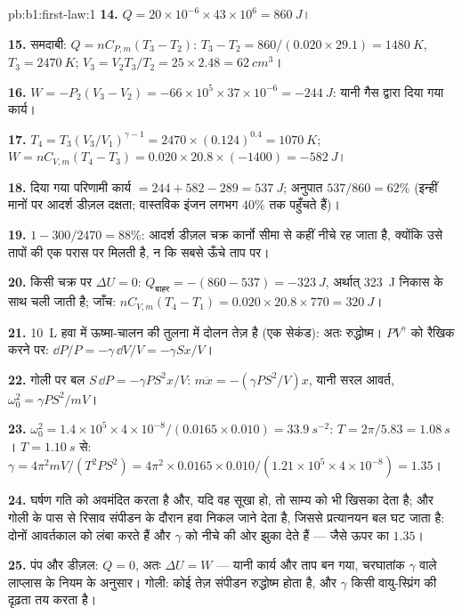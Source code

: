 \begin{solution}{pb:b1:first-law:1}
\textbf{14.} $Q = 20\times10^{-6} \times 43\times10^6 = \qty{860}{J}$।

\textbf{15.} समदाबी: $Q = nC_{P,m}(T_3 - T_2)$: $T_3 - T_2 = 860/(0.020 \times
29.1) = \qty{1480}{K}$, $T_3 = \qty{2470}{K}$; $V_3 = V_2T_3/T_2 = 25 \times
2.48 = \qty{62}{cm^3}$।

\textbf{16.} $W = -P_2(V_3 - V_2) = -66\times10^5 \times 37\times10^{-6} =
\qty{-244}{J}$: यानी गैस द्वारा दिया गया कार्य।

\textbf{17.} $T_4 = T_3(V_3/V_1)^{\gamma - 1} = 2470 \times (0.124)^{0.4} =
\qty{1070}{K}$; $W = nC_{V,m}(T_4 - T_3) = 0.020 \times 20.8 \times (-1400) =
\qty{-582}{J}$।

\textbf{18.} दिया गया परिणामी कार्य $= 244 + 582 - 289 = \qty{537}{J}$; अनुपात
$537/860 = 62\%$ (इन्हीं मानों पर आदर्श डीज़ल दक्षता; वास्तविक इंजन लगभग
$40\%$ तक पहुँचते हैं)।

\textbf{19.} $1 - 300/2470 = 88\%$: आदर्श डीज़ल चक्र कार्नो सीमा से कहीं
नीचे रह जाता है, क्योंकि उसे  तापों की एक परास पर मिलती है, न कि
सबसे ऊँचे ताप पर।

\textbf{20.} किसी चक्र पर $\Delta U = 0$: $Q_{\text{बाहर}} = -(860 - 537) =
\qty{-323}{J}$, अर्थात् \qty{323}{J} निकास के साथ चली जाती है; जाँच:
$nC_{V,m}(T_4 - T_1) = 0.020 \times 20.8 \times 770 = \qty{320}{J}$।

\textbf{21.} \qty{10}{L} हवा में ऊष्मा-चालन की तुलना में दोलन तेज़ है (एक
सेकंड): अतः रुद्धोष्म। $PV^\gamma$ को रैखिक करने पर:
$\dd P/P = -\gamma\,\dd V/V = -\gamma Sx/V$।

\textbf{22.} गोली पर बल $S\,\dd P = -\gamma PS^2x/V$: $m\ddot x =
-(\gamma PS^2/V)x$, यानी सरल आवर्त, $\omega_0^2 = \gamma PS^2/mV$।

\textbf{23.} $\omega_0^2 = 1.4 \times 10^5 \times 4\times10^{-8}/(0.0165 \times 0.010)
= \qty{33.9}{s^{-2}}$: $T = 2\pi/5.83 = \qty{1.08}{s}$। $T = \qty{1.10}{s}$ से:
$\gamma = 4\pi^2mV/(T^2PS^2) = 4\pi^2 \times 0.0165 \times 0.010/(1.21 \times 10^5
\times 4\times10^{-8}) = 1.35$।

\textbf{24.} घर्षण गति को अवमंदित करता है और, यदि वह सूखा हो, तो साम्य को
भी खिसका देता है; और गोली के पास से रिसाव संपीडन के दौरान हवा निकल जाने
देता है, जिससे प्रत्यानयन बल घट जाता है: दोनों आवर्तकाल को लंबा करते हैं
और $\gamma$ को नीचे की ओर झुका देते हैं --- जैसे ऊपर का $1.35$।

\textbf{25.} पंप और डीज़ल: $Q = 0$, अतः $\Delta U = W$ --- यानी कार्य  और ताप बन गया, चरघातांक $\gamma$ वाले लाप्लास के नियम के अनुसार।
गोली: कोई तेज़ संपीडन रुद्धोष्म होता है, और $\gamma$ किसी वायु-स्प्रिंग की
दृढ़ता तय करता है।
\end{solution}
